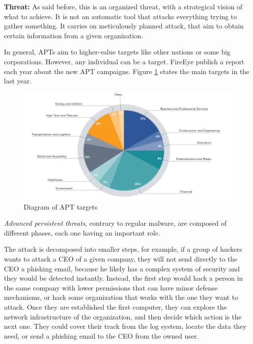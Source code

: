 \textbf{Threat:} As said before, this is an organized threat, with a strategical vision of what to achieve. It is not an automatic tool that attacks everything trying to gather something. It carries on meticulously planned attack, that aim to obtain certain information from a given organization. 

In general, APTs aim to higher-value targets like other nations or some big corporations. However, any individual can be a target. FireEye publish a report each year about the new APT campaigns. Figure \ref{fig:diag} states the main targets in the last year.\\

\begin{figure}[!h]
	\centering
	\label{fig:diag}
	\includegraphics[width=1.0\columnwidth]{graph}
	\caption{Diagram of APT targets}
\end{figure}





\textit{Advanced persistent threats}, contrary to regular malware, are composed of different phases, each one having an important role. 

The attack is decomposed into smaller steps, for example, if a group of hackers wants to attack a CEO of a given company, they will not send directly to the CEO a phishing email, because he likely has a complex system of security and they would be detected instantly. 
Instead, the first step would hack a person in the same company with lower permissions that can have minor defense mechanisms, or hack some organization that works with the one they want to attack. Once they are established the first computer, they can explore the network infrastructure of the organization, and then decide which action is the next one.
They could cover their track from the log system, locate the data they need, or send a phishing email to the CEO from the owned user.

